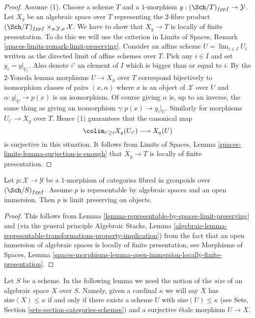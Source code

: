 \begin{proof}
\medskip\noindent
Assume (1). Choose a scheme $T$ and a $1$-morphism
$y : (\Sch/T)_{fppf} \to \mathcal{Y}$. Let
$X_y$ be an algebraic space over $T$ representing the $2$-fibre product
$(\Sch/T)_{fppf} \times_{y, \mathcal{Y}, p} \mathcal{X}$.
We have to show that $X_y \to T$ is locally of finite presentation.
To do this we will use the criterion in
Limits of Spaces, Remark \ref{spaces-limits-remark-limit-preserving}.
Consider an affine scheme $U = \lim_{i \in I} U_i$ written as the
directed limit of affine schemes over $T$.
Pick any $i \in I$ and set $y_i = y|_{U_i}$. Also denote $i'$ an element
of $I$ which is bigger than or equal to $i$. By the $2$-Yoneda lemma
morphisms $U \to X_y$ over $T$ correspond bijectively
to isomorphism classes of pairs $(x, \alpha)$ where $x$ is an object
of $\mathcal{X}$ over $U$ and $\alpha : y|_U \to p(x)$ is an isomorphism.
Of course giving $\alpha$ is, up to an inverse, the same thing as giving
an isomorphism $\gamma : p(x) \to y_i|_U$.
Similarly for morphisms $U_{i'} \to X_y$ over $T$. Hence (1) guarantees
that the canonical map
$$
\colim_{i' \geq i} X_y(U_{i'}) \longrightarrow X_y(U)
$$
is surjective in this situation. It follows from
Limits of Spaces, Lemma \ref{spaces-limits-lemma-surjection-is-enough}
that $X_y \to T$ is locally of finite presentation.
\end{proof}

\begin{lemma}
\label{lemma-open-immersion-limit-preserving}
Let $p : \mathcal{X} \to \mathcal{Y}$ be a $1$-morphism of categories
fibred in groupoids over $(\Sch/S)_{fppf}$. Assume $p$ is representable
by algebraic spaces and an open immersion. Then $p$ is limit preserving
on objects.
\end{lemma}

\begin{proof}
This follows from
Lemma \ref{lemma-representable-by-spaces-limit-preserving}
and (via the general principle
Algebraic Stacks, Lemma
\ref{algebraic-lemma-representable-transformations-property-implication})
from the fact that an open immersion of algebraic spaces is
locally of finite presentation, see
Morphisms of Spaces, Lemma
\ref{spaces-morphisms-lemma-open-immersion-locally-finite-presentation}.
\end{proof}

\noindent
Let $S$ be a scheme. In the following lemma we need the notion of the
{\it size} of an algebraic space $X$ over $S$. Namely, given a cardinal
$\kappa$ we will say $X$ has $\text{size}(X) \leq \kappa$ if and only
if there exists a scheme $U$ with $\text{size}(U) \leq \kappa$ (see
Sets, Section \ref{sets-section-categories-schemes}) and a surjective
\'etale morphism $U \to X$.

